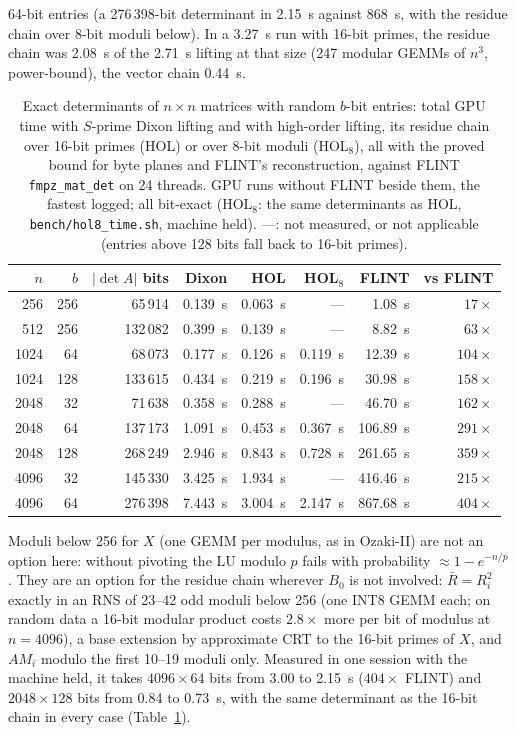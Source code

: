\documentclass[11pt]{article}
\begin{document}
64-bit entries (a 276\,398-bit determinant in 2.15~s against 868~s, with the residue chain over 8-bit moduli below). In a
3.27~s run with 16-bit primes, the residue chain was 2.08~s of the 2.71~s lifting at that size (247 modular GEMMs of $n^3$,
power-bound), the vector chain 0.44~s.
\begin{table}[t]\centering
\caption{Exact determinants of $n\times n$ matrices with random $b$-bit entries: total GPU time with $S$-prime Dixon lifting
and with high-order lifting, its residue chain over 16-bit primes (HOL) or over 8-bit moduli (HOL$_8$), all with the proved
bound for byte planes and FLINT's reconstruction, against FLINT \texttt{fmpz\_mat\_det} on 24 threads. GPU runs without FLINT
beside them, the fastest logged; all bit-exact (HOL$_8$: the same determinants as HOL, \texttt{bench/hol8\_time.sh}, machine
held). ---: not measured, or not applicable (entries above 128 bits fall back to 16-bit primes).}\label{tab:hol}
\begin{tabular}{rrrrrrrr}\toprule
$n$ & $b$ & $|\det A|$ bits & Dixon & HOL & HOL$_8$ & FLINT & vs FLINT \\\midrule
256 & 256 & 65\,914 & 0.139~s & 0.063~s & --- & 1.08~s & $17\times$ \\
512 & 256 & 132\,082 & 0.399~s & 0.139~s & --- & 8.82~s & $63\times$ \\
1024 & 64 & 68\,073 & 0.177~s & 0.126~s & 0.119~s & 12.39~s & $104\times$ \\
1024 & 128 & 133\,615 & 0.434~s & 0.219~s & 0.196~s & 30.98~s & $158\times$ \\
2048 & 32 & 71\,638 & 0.358~s & 0.288~s & --- & 46.70~s & $162\times$ \\
2048 & 64 & 137\,173 & 1.091~s & 0.453~s & 0.367~s & 106.89~s & $291\times$ \\
2048 & 128 & 268\,249 & 2.946~s & 0.843~s & 0.728~s & 261.65~s & $359\times$ \\
4096 & 32 & 145\,330 & 3.425~s & 1.934~s & --- & 416.46~s & $215\times$ \\
4096 & 64 & 276\,398 & 7.443~s & 3.004~s & 2.147~s & 867.68~s & $404\times$ \\\bottomrule
\end{tabular}
\end{table}
Moduli below 256 for $X$ (one GEMM per modulus, as in Ozaki-II) are not an option here: without pivoting the LU modulo $p$
fails with probability $\approx 1-e^{-n/p}$. They are an option for the residue chain wherever $B_0$ is not involved: $\bar R=R_i^2$
exactly in an RNS of 23--42 odd moduli below 256 (one INT8 GEMM each; on random data a 16-bit modular product costs
$2.8\times$ more per bit of modulus at $n=4096$), a base extension by approximate CRT to the 16-bit primes of $X$, and $AM_i$
modulo the first 10--19 moduli only. Measured in one session with the machine held, it takes $4096\times64$ bits from 3.00
to 2.15~s ($404\times$ FLINT) and $2048\times128$ bits from 0.84 to 0.73~s, with the same determinant as the 16-bit chain in
every case (Table~\ref{tab:hol}).
\end{document}
